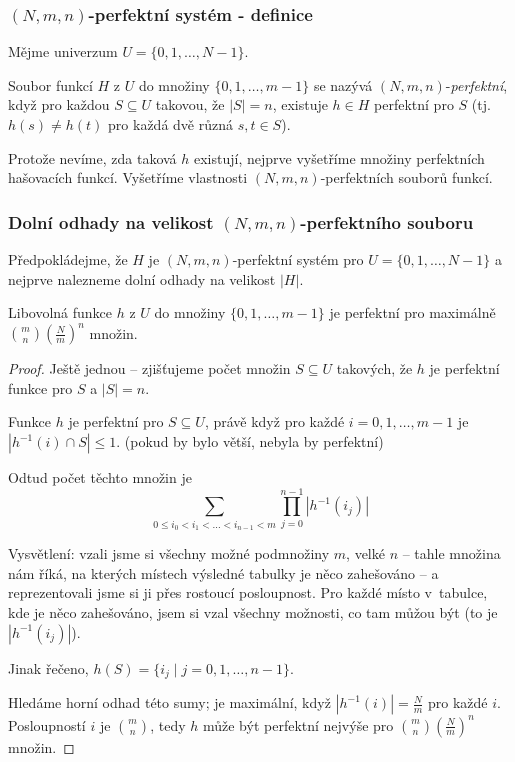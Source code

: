 \documentclass[a4paper,12pt]{article}
\begin{document}
\subsubsection{$(N,m,n)$-perfektní systém - definice}

Mějme univerzum $U=\{0,1,\dots,N-1\}$. 

\begin{definice}Soubor funkcí $H$ z 
$U$ do množiny $\{0,1,\dots,m-1\}$ se nazývá 
$(N,m,n)$-\emph{perfektní}, když pro každou $S\subseteq 
U$ 
takovou, že $|S|=n$, existuje $h\in H$ perfektní pro $S$ (tj. 
$h(s)\ne h(t)$ pro každá dvě různá $s,t\in S$).
\end{definice}

Protože nevíme, zda taková $h$ existují, nejprve 
vyšetříme mno\-ži\-ny perfektních hašovacích 
funkcí. Vyšetříme vlastnosti $(N,m,n)$-perfektních 
souborů funkcí.

\subsubsection{Dolní odhady na velikost $(N,m,n)$-perfektního souboru}

Předpokládejme, že $H$ je $(N,m,n)$-perfektní 
systém pro $U=\{0,1,\dots,N-1\}$ a nejprve nalezneme dolní 
odhady na velikost $|H|$.

\begin{lemma}
    Libovolná funkce $h$ z $U$ do množiny $\{0,1,\dots,m-
    1\}$ je perfektní pro maximálně $\binom 
    mn(\frac Nm)^n$ množin.
\end{lemma}
\begin{proof}
    Ještě jednou -- zjišťujeme počet množin $S\subseteq U$ takových, že  
    $h$ je perfektní funkce pro $S$ a $|S|=n$.
    
    Funkce $h$ je perfektní pro 
    $S\subseteq U$, právě když pro každé $i=0,1,\dots,m-
    1$ je 
    $|h^{-1}(i)\cap S|\le 1$. (pokud by bylo větší, nebyla by perfektní)
    
    Odtud počet těchto množin je
    $$\sum_{0\le i_0<i_1<\dots<i_{
    n-1}<m} \prod_{j=0}^{n-1}|h^{-1}(i_j)|$$
    
    Vysvětlení: vzali jsme si všechny možné podmnožiny $m$, velké $n$ -- tahle množina nám říká, na kterých místech výsledné tabulky je něco zahešováno -- a reprezentovali jsme si ji přes rostoucí posloupnost. Pro každé místo v~tabulce, kde je něco zahešováno, jsem si vzal všechny možnosti, co tam můžou být (to je $|h^{-1}(i_j)|$).
    
    Jinak řečeno, $h(S)=\{i_j\mid j=0,1,\dots,n-1\}$.
    
    Hledáme horní odhad této sumy; je maximální, když $|h^{-1}(
    i)|=\frac Nm$ pro každé $i$. Posloupností $i$ je $\binom mn$, tedy $h$ může být perfektní nejvýše pro $\binom 
    mn(\frac Nm)^n$ 
    množin.
\end{proof}
    
\end{document}
